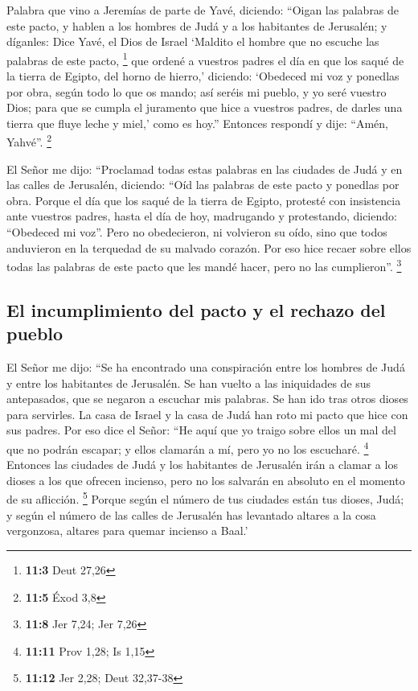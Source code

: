 \begin{paracol}{2}
 Palabra que vino a Jeremías de parte de Yavé, diciendo:
 ``Oigan las palabras de este pacto, y hablen a los
hombres de Judá y a los habitantes de Jerusalén;  y
díganles: Dice Yavé, el Dios de Israel `Maldito el hombre que no escuche
las palabras de este pacto, \footnote{\textbf{11:3} Deut 27,26}
 que ordené a vuestros padres el día en que los saqué de
la tierra de Egipto, del horno de hierro,' diciendo: `Obedeced mi voz y
ponedlas por obra, según todo lo que os mando; así seréis mi pueblo, y
yo seré vuestro Dios;  para que se cumpla el juramento que
hice a vuestros padres, de darles una tierra que fluye leche y miel,'
como es hoy.'' Entonces respondí y dije: ``Amén, Yahvé''. \footnote{\textbf{11:5}
  Éxod 3,8}

 El Señor me dijo: ``Proclamad todas estas palabras en las
ciudades de Judá y en las calles de Jerusalén, diciendo: ``Oíd las
palabras de este pacto y ponedlas por obra.  Porque el día
que los saqué de la tierra de Egipto, protesté con insistencia ante
vuestros padres, hasta el día de hoy, madrugando y protestando,
diciendo: ``Obedeced mi voz''.  Pero no obedecieron, ni
volvieron su oído, sino que todos anduvieron en la terquedad de su
malvado corazón. Por eso hice recaer sobre ellos todas las palabras de
este pacto que les mandé hacer, pero no las cumplieron''. \footnote{\textbf{11:8}
  Jer 7,24; Jer 7,26}

\hypertarget{el-incumplimiento-del-pacto-y-el-rechazo-del-pueblo}{%
\subsection{El incumplimiento del pacto y el rechazo del
pueblo}\label{el-incumplimiento-del-pacto-y-el-rechazo-del-pueblo}}

 El Señor me dijo: ``Se ha encontrado una conspiración
entre los hombres de Judá y entre los habitantes de Jerusalén.
 Se han vuelto a las iniquidades de sus antepasados, que
se negaron a escuchar mis palabras. Se han ido tras otros dioses para
servirles. La casa de Israel y la casa de Judá han roto mi pacto que
hice con sus padres.  Por eso dice el Señor: ``He aquí
que yo traigo sobre ellos un mal del que no podrán escapar; y ellos
clamarán a mí, pero yo no los escucharé. \footnote{\textbf{11:11} Prov
  1,28; Is 1,15}  Entonces las ciudades de Judá y los
habitantes de Jerusalén irán a clamar a los dioses a los que ofrecen
incienso, pero no los salvarán en absoluto en el momento de su
aflicción. \footnote{\textbf{11:12} Jer 2,28; Deut 32,37-38}
 Porque según el número de tus ciudades están tus dioses,
Judá; y según el número de las calles de Jerusalén has levantado altares
a la cosa vergonzosa, altares para quemar incienso a Baal.'


\end{paracol}
